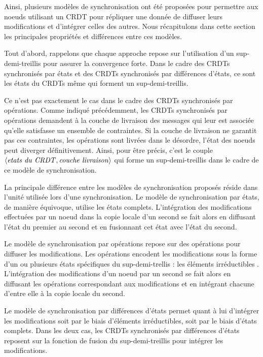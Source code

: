 Ainsi, plusieurs modèles de synchronisation ont été proposées pour permettre aux noeuds utilisant un \ac{CRDT} pour répliquer une donnée de diffuser leurs modifications et d'intégrer celles des autres.
Nous récapitulons dans cette section les principales propriétés et différences entre ces modèles.

Tout d'abord, rappelons que chaque approche repose sur l'utilisation d'un sup-demi-treillis pour assurer la convergence forte.
Dans le cadre des \acp{CRDT} synchronisés par états et des \acp{CRDT} synchronisés par différences d'états, ce sont les états du \acp{CRDT} même qui forment un sup-demi-treillis.

Ce n'est pas exactement le cas dans le cadre des \acp{CRDT} synchronisés par opérations.
Comme indiqué précédemment, les \acp{CRDT} synchronisés par opérations demandent à la couche de livraison des messages qui leur est associée qu'elle satisfasse un ensemble de contraintes.
Si la couche de livraison ne garantit pas ces contraintes, \eg les opérations sont livrées dans le désordre, l'état des noeuds peut diverger définitivement.
Ainsi, pour être précis, c'est le couple $\langle \mathit{etats~du~CRDT},\mathit{couche~livraison} \rangle$ qui forme un sup-demi-treillis dans le cadre de ce modèle de synchronisation.

La principale différence entre les modèles de synchronisation proposés réside dans l'unité utilisée lors d'une synchronisation.
Le modèle de synchronisation par états, de manière équivoque, utilise les états complets.
L'intégration des modifications effectuées par un noeud dans la copie locale d'un second se fait alors en diffusant l'état du premier au second et en fusionnant cet état avec l'état du second.

Le modèle de synchronisation par opérations repose sur des opérations pour diffuser les modifications.
Les opérations encodent les modifications sous la forme  d'un ou plusieurs états spécifiques du sup-demi-trellis : les éléments irréductibles .
L'intégration des modifications d'un noeud par un second se fait alors en diffusant les opérations correspondant aux modifications et en intégrant chacune d'entre elle à la copie locale du second.

Le modèle de synchronisation par différences d'états permet quant à lui d'intégrer les modifications soit par le biais d'éléments irréductibles, soit par le biais d'états complets.
Dans les deux cas, les \acp{CRDT} synchronisés par différences d'états reposent sur la fonction de fusion du sup-demi-treillis pour intégrer les modifications.

